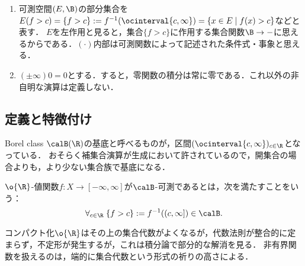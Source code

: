 \documentclass[uplatex, dvipdfmx]{jsreport}
\begin{document}
\begin{notation}\mbox{}
    \begin{enumerate}
        \item 可測空間$(E,\B)$の部分集合を
        $E(f>c)=\{f>c\}:=f^{-1}(\ocinterval{c,\infty})=\{x\in E\mid f(x)>c\}$などと表す．
        $E$を左作用と見ると，集合$\{f>c\}$に作用する集合関数$\B\to-$に思えるからである．$(\cdot)$内部は可測関数によって記述された条件式・事象と思える．
        \item $(\pm\infty)0=0$とする．すると，零関数の積分は常に零である．これ以外の非自明な演算は定義しない．
    \end{enumerate}
\end{notation}

\subsection{定義と特徴付け}

\begin{tcolorbox}[colframe=ForestGreen, colback=ForestGreen!10!white,breakable,colbacktitle=ForestGreen!40!white,coltitle=black,fonttitle=\bfseries\sffamily,
title=]
    Borel class $\calB(\R)$の基底と呼べるものが，区間$(\ocinterval{c,\infty})_{c\in\R}$となっている．
    おそらく補集合演算が生成において許されているので，開集合の場合よりも，より少ない集合族で基底になる．
\end{tcolorbox}

\begin{definition}
    $\o{\R}$-値関数$f:X\to[-\infty,\infty]$が$\calB$-可測であるとは，次を満たすことをいう：
    \[\forall_{c\in\R}\;\{f>c\}:=f^{-1}((c,\infty])\in\calB.\]
\end{definition}
\begin{remarks}
    コンパクト化$\o{\R}$はその上の集合代数がよくなるが，代数法則が整合的に定まらず，不定形が発生するが，これは積分論で部分的な解消を見る．
    非有界関数を扱えるのは，端的に集合代数という形式の祈りの高さによる．
\end{remarks}
\end{document}
